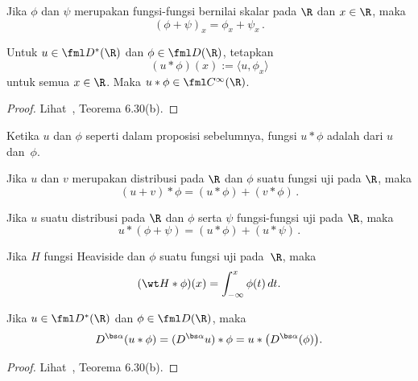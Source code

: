 \begin{prop} Jika $\phi$ dan $\psi$ merupakan fungsi-fungsi bernilai skalar pada $\R$ dan $x \in \R$, maka
   \[ (\phi + \psi)_x = \phi_x + \psi_x\,. \]
\end{prop}

\begin{prop}\label{prop_convol_distr1} Untuk $u \in \fml D^*(\R)$ dan $\phi \in \fml D(\R)$,
tetapkan
   \[ (u \ast \phi)(x) := \langle u,\phi_x \rangle \]
untuk semua $x \in \R$. Maka $u \ast \phi \in \fml C^\infty(\R)$.
\end{prop}

\begin{proof} Lihat~\cite{Rudin:1991}, Teorema 6.30(b).  \ns
\end{proof}

\begin{defn} Ketika $u$ dan $\phi$ seperti dalam proposisi sebelumnya, fungsi $u \ast \phi$ adalah
 dari $u$ dan~$\phi$.
\end{defn}

\begin{prop} Jika $u$ dan $v$ merupakan distribusi pada $\R$ dan $\phi$ suatu fungsi uji pada $\R$, maka
   \[ (u + v) \ast \phi = (u \ast \phi) + (v \ast \phi)\,. \]
\end{prop}

\begin{prop} Jika $u$ suatu distribusi pada $\R$ dan $\phi$ serta $\psi$ fungsi-fungsi uji pada $\R$, maka
   \[ u \ast (\phi + \psi) = (u \ast \phi) + (u \ast \psi)\,. \]
\end{prop}

\begin{exam} Jika $H$ fungsi Heaviside dan $\phi$ suatu fungsi uji pada~$\R$, maka
   \[ (\wt H \ast \phi)(x) = \int_{-\infty}^x \phi(t)\,dt. \]
\end{exam}

\begin{prop}\label{prop_convol_distr2} Jika $u \in \fml D^*(\R)$ dan $\phi \in \fml D(\R)$, maka
   \[ D^{\bs\alpha}(u \ast \phi) = (D^{\bs\alpha}u) \ast \phi = u \ast \bigl(D^{\bs\alpha}(\phi)\bigr). \]
\end{prop}

\begin{proof} Lihat~\cite{Rudin:1991}, Teorema 6.30(b).  \ns
\end{proof}

